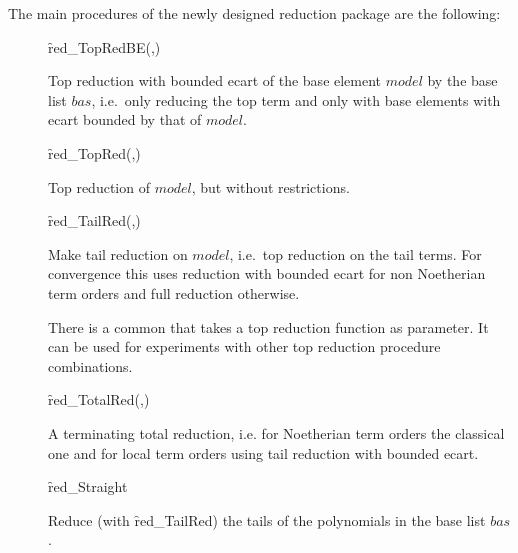 The main procedures of the newly designed reduction package are the
following:
\begin{description}

\item[]
  \begin{syntax}
    \f{red\_TopRedBE}(,)
  \end{syntax}
  \hypertarget{procedure:RED_TOPREDBE}{}
Top reduction with bounded ecart of the base element $model$ by
the base list $bas$, i.e.\ only reducing the top term and only with
base elements with ecart bounded by that of $model$.

\item[]
  \begin{syntax}
    \f{red\_TopRed}(,)
  \end{syntax}
  \hypertarget{procedure:RED_TOPRED}{}
Top reduction of $model$, but without restrictions.

\item[]
  \begin{syntax}
    \f{red\_TailRed}(,)
  \end{syntax}
  \hypertarget{procedure:RED_TAILRED}{}
Make tail reduction on $model$, i.e.\ top reduction on the tail
terms. For convergence this uses reduction with bounded ecart for non
Noetherian term orders and full reduction otherwise.
\medskip

There is a common  that takes a top reduction
function as parameter. It can be used for experiments with other top
reduction procedure combinations.

\item[]
  \begin{syntax}
    \f{red\_TotalRed}(,)
  \end{syntax}
  \hypertarget{procedure:RED_TOTALRED}{}
A terminating total reduction, i.e. for Noetherian term orders
the classical one and for local term orders using tail reduction with
bounded ecart.

\item[]
  \begin{syntax}
    \f{red\_Straight} 
  \end{syntax}
  \hypertarget{procedure:RED_STRAIGHT}{}
Reduce (with \f{red\_TailRed}) the tails of the polynomials in
the base list $bas$.


\end{description}
